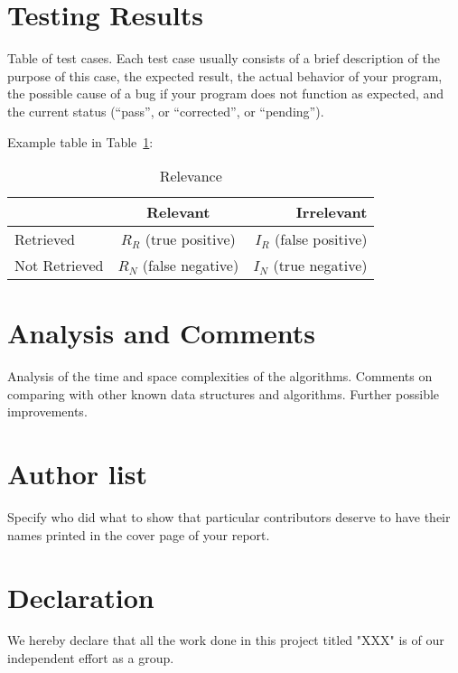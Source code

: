\documentclass[twoside]{article}
\begin{document}
\begin{CJK*}{UTF8}{gbsn}
\section{Testing Results}

Table of test cases.  
Each test case usually consists of a brief description of the purpose of this case, the expected result, 
the actual behavior of your program, the possible cause of a bug if your program does not function as expected, 
and the current status (“pass”, or “corrected”, or “pending”).

Example table in Table~\ref{tab:relevance}:
\begin{table}[h!]
  \begin{center}
    \caption{Relevance}
    \label{tab:relevance}
    \begin{tabular}{|l|c|r|} %
    \hline
       & \textbf{Relevant} & \textbf{Irrelevant}\\
      \hline
      Retrieved & $R_R$ (true positive) & $I_R$ (false positive) \\ \hline
      Not Retrieved & $R_N $ (false negative)& $I_N$ (true negative)\\
      \hline
    \end{tabular}
  \end{center}
\end{table}

\section{Analysis and Comments}

Analysis of the time and space complexities of the algorithms.  
Comments on comparing with other known data structures and algorithms.  
Further possible improvements.

\section{Author list}
Specify who did what to show that particular contributors deserve to have their names printed in the cover page of your report.

\section*{Declaration}
We hereby declare that all the work done in this project titled "XXX" is of our independent effort as a group.


\end{CJK*}
\end{document}
